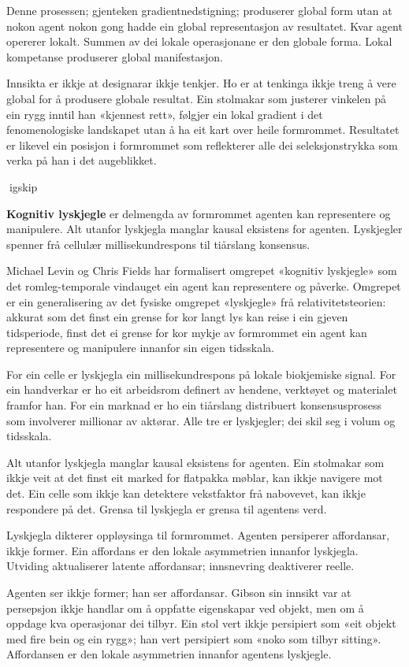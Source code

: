 Denne prosessen; gjenteken gradientnedstigning; produserer global form utan at nokon agent nokon gong hadde ein global representasjon av resultatet. Kvar agent opererer lokalt. Summen av dei lokale operasjonane er den globale forma. Lokal kompetanse produserer global manifestasjon.

Innsikta er ikkje at designarar ikkje tenkjer. Ho er at tenkinga ikkje treng å vere global for å produsere globale resultat. Ein stolmakar som justerer vinkelen på ein rygg inntil han «kjennest rett», følgjer ein lokal gradient i det fenomenologiske landskapet utan å ha eit kart over heile formrommet. Resultatet er likevel ein posisjon i formrommet som reflekterer alle dei seleksjonstrykka som verka på han i det augeblikket.

igskip

\textbf{Kognitiv lyskjegle} er delmengda av formrommet agenten kan representere og manipulere. Alt utanfor lyskjegla manglar kausal eksistens for agenten. Lyskjegler spenner frå cellulær millisekundrespons til tiårslang konsensus.

Michael Levin og Chris Fields har formalisert omgrepet «kognitiv lyskjegle» som det romleg-temporale vindauget ein agent kan representere og påverke. Omgrepet er ein generalisering av det fysiske omgrepet «lyskjegle» frå relativitetsteorien: akkurat som det finst ein grense for kor langt lys kan reise i ein gjeven tidsperiode, finst det ei grense for kor mykje av formrommet ein agent kan representere og manipulere innanfor sin eigen tidsskala.

For ein celle er lyskjegla ein millisekundrespons på lokale biokjemiske signal. For ein handverkar er ho eit arbeidsrom definert av hendene, verktøyet og materialet framfor han. For ein marknad er ho ein tiårslang distribuert konsensusprosess som involverer millionar av aktørar. Alle tre er lyskjegler; dei skil seg i volum og tidsskala.

Alt utanfor lyskjegla manglar kausal eksistens for agenten. Ein stolmakar som ikkje veit at det finst eit marked for flatpakka møblar, kan ikkje navigere mot det. Ein celle som ikkje kan detektere vekstfaktor frå nabovevet, kan ikkje respondere på det. Grensa til lyskjegla er grensa til agentens verd.

Lyskjegla dikterer oppløysinga til formrommet. Agenten persiperer affordansar, ikkje former. Ein affordans er den lokale asymmetrien innanfor lyskjegla. Utviding aktualiserer latente affordansar; innsnevring deaktiverer reelle.

Agenten ser ikkje former; han ser affordansar. Gibson sin innsikt var at persepsjon ikkje handlar om å oppfatte eigenskapar ved objekt, men om å oppdage kva operasjonar dei tilbyr. Ein stol vert ikkje persipiert som «eit objekt med fire bein og ein rygg»; han vert persipiert som «noko som tilbyr sitting». Affordansen er den lokale asymmetrien innanfor agentens lyskjegle.

